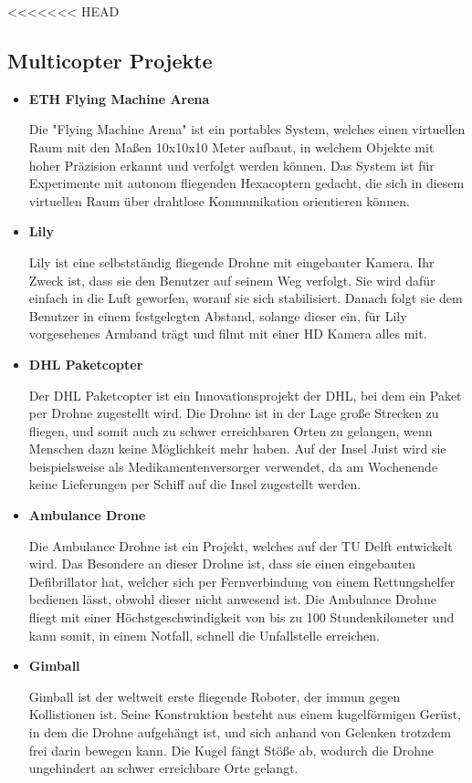 <<<<<<< HEAD
  \subsection*{Multicopter Projekte}
  \begin{itemize}
      \item \textbf{ETH Flying Machine Arena}

      Die {"Flying Machine Arena"\cite{eth}} ist ein portables System, welches einen virtuellen Raum mit den Maßen 10x10x10 Meter aufbaut, in welchem
      Objekte mit hoher Präzision erkannt und verfolgt werden können. Das System ist für Experimente mit autonom fliegenden Hexacoptern
      gedacht, die sich in diesem virtuellen Raum über drahtlose Kommunikation orientieren können.

      \item \textbf{Lily}

      {Lily\cite{lily}} ist eine selbstständig fliegende Drohne mit eingebauter Kamera. Ihr Zweck ist, dass sie den Benutzer auf seinem Weg verfolgt.
      Sie wird dafür einfach in die Luft geworfen, worauf sie sich stabilisiert. Danach folgt sie dem Benutzer in einem festgelegten Abstand, solange dieser ein, für Lily
      vorgesehenes Armband trägt und filmt mit einer HD Kamera alles mit.

      \item \textbf{DHL Paketcopter}

      Der {DHL Paketcopter\cite{dhl}} ist ein Innovationsprojekt der DHL, bei dem ein Paket per Drohne zugestellt wird. Die Drohne ist in der Lage große Strecken zu fliegen,
      und somit auch zu schwer erreichbaren Orten zu gelangen, wenn Menschen dazu keine Möglichkeit mehr haben. Auf der Insel Juist wird sie beispielsweise als
      Medikamentenversorger verwendet, da am Wochenende keine Lieferungen per Schiff auf die Insel zugestellt werden.

      \item \textbf{Ambulance Drone}

      Die {Ambulance Drohne\cite{ambulancedrone}} ist ein Projekt, welches auf der TU Delft entwickelt wird. Das Besondere an dieser Drohne ist, dass sie einen eingebauten Defibrillator hat, welcher
      sich per Fernverbindung von einem Rettungshelfer bedienen lässt, obwohl dieser nicht anwesend ist. Die Ambulance Drohne fliegt mit einer Höchstgeschwindigkeit von bis zu
      100 Stundenkilometer und kann somit, in einem Notfall, schnell die Unfallstelle erreichen.

      \item \textbf{Gimball}

      {Gimball\cite{gimball}} ist der weltweit erste fliegende Roboter, der immun gegen Kollistionen ist. Seine Konstruktion besteht aus einem kugelförmigen Gerüst, in dem die Drohne
      aufgehängt ist, und sich anhand von Gelenken trotzdem frei darin bewegen kann. Die Kugel fängt Stöße ab, wodurch die Drohne ungehindert an schwer erreichbare
      Orte gelangt.

  \end{itemize}

